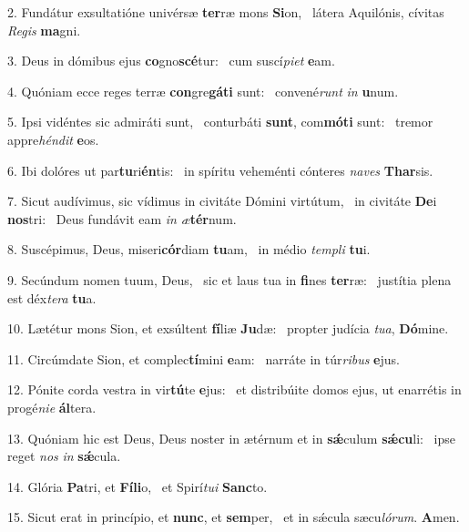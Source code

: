 2. Fundátur exsultatióne univérsæ \textbf{ter}ræ mons \textbf{Si}on, \ast\  látera Aquilónis, cívitas \textit{Re}\textit{gis} \textbf{ma}gni.\

3. Deus in dómibus ejus \textbf{co}gno\textbf{scé}tur: \ast\  cum suscí\textit{pi}\textit{et} \textbf{e}am.\

4. Quóniam ecce reges terræ \textbf{con}gre\textbf{gá}\textbf{ti} sunt: \ast\  convené\textit{runt} \textit{in} \textbf{u}num.\

5. Ipsi vidéntes sic admiráti sunt, \dag\  conturbáti \textbf{sunt}, com\textbf{mó}\textbf{ti} sunt: \ast\  tremor appre\textit{hén}\textit{dit} \textbf{e}os.\

6. Ibi dolóres ut par\textbf{tu}ri\textbf{én}tis: \ast\  in spíritu veheménti cónteres \textit{na}\textit{ves} \textbf{Thar}sis.\

7. Sicut audívimus, sic vídimus in civitáte Dómini virtútum, \dag\  in civitáte \textbf{De}i \textbf{nos}tri: \ast\  Deus fundávit eam \textit{in} \textit{æ}\textbf{tér}num.\

8. Suscépimus, Deus, miseri\textbf{cór}diam \textbf{tu}am, \ast\  in médio \textit{tem}\textit{pli} \textbf{tu}i.\

9. Secúndum nomen tuum, Deus, \dag\  sic et laus tua in \textbf{fi}nes \textbf{ter}ræ: \ast\  justítia plena est déx\textit{te}\textit{ra} \textbf{tu}a.\

10. Lætétur mons Sion, et exsúltent \textbf{fí}liæ \textbf{Ju}dæ: \ast\  propter judícia \textit{tu}\textit{a}, \textbf{Dó}mine.\

11. Circúmdate Sion, et complec\textbf{tí}mini \textbf{e}am: \ast\  narráte in túr\textit{ri}\textit{bus} \textbf{e}jus.\

12. Pónite corda vestra in vir\textbf{tú}te \textbf{e}jus: \ast\  et distribúite domos ejus, ut enarrétis in progé\textit{ni}\textit{e} \textbf{ál}tera.\

13. Quóniam hic est Deus, Deus noster in ætérnum et in \textbf{sǽ}culum \textbf{sǽ}\textbf{cu}li: \ast\  ipse reget \textit{nos} \textit{in} \textbf{sǽ}cula.\

14. Glória \textbf{Pa}tri, et \textbf{Fí}\textbf{li}o, \ast\  et Spirí\textit{tu}\textit{i} \textbf{Sanc}to.\

15. Sicut erat in princípio, et \textbf{nunc}, et \textbf{sem}per, \ast\  et in sǽcula sæcu\textit{ló}\textit{rum}. \textbf{A}men.\

